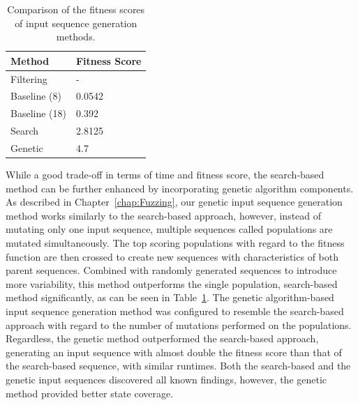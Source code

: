 \begin{table}[b]
	\centering
	\begin{tabular}{|l|l|}
		\hline
		\rowcolor[HTML]{EFEFEF} 
		\textbf{Method} & \textbf{Fitness Score}  \\ \hline
		Filtering              		&  -          \\ \hline
		Baseline (8)              	&  0.0542     \\ \hline
		Baseline (18)              	&  0.392      \\ \hline
		Search              		&  2.8125     \\ \hline
		Genetic              		&  4.7        \\ \hline
	\end{tabular}
	\caption{Comparison of the fitness scores of input sequence generation methods.}
	\label{tab:compbasesearch}
\end{table}

While a good trade-off in terms of time and fitness score, the search-based method can be further enhanced by incorporating genetic algorithm components. As described in Chapter~\ref{chap:Fuzzing}, our genetic input sequence generation method works similarly to the search-based approach, however, instead of mutating only one input sequence, multiple sequences called populations are mutated simultaneously. The top scoring populations with regard to the fitness function are then crossed to create new sequences with characteristics of both parent sequences. Combined with randomly generated sequences to introduce more variability, this method outperforms the single population, search-based method significantly, as can be seen in Table~\ref{tab:compbasesearch}. The genetic algorithm-based input sequence generation method was configured to resemble the search-based approach with regard to the number of mutations performed on the populations. Regardless, the genetic method outperformed the search-based approach, generating an input sequence with almost double the fitness score than that of the search-based sequence, with similar runtimes. Both the search-based and the genetic input sequences discovered all known findings, however, the genetic method provided better state coverage.


